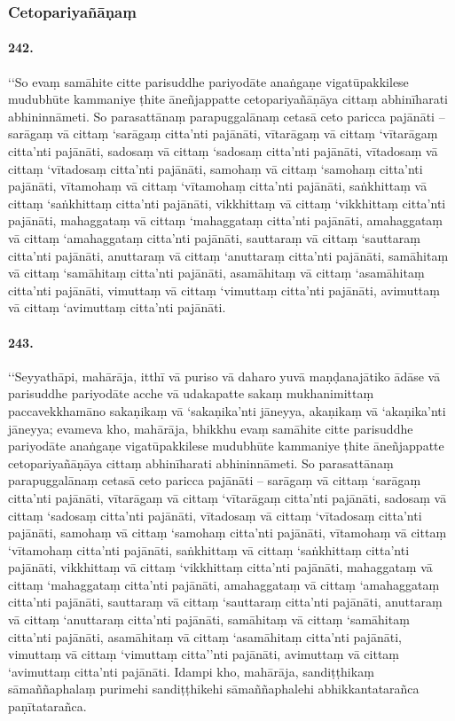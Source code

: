 \subsubsection{Cetopariyañāṇaṃ}

\paragraph{242.} ‘‘So evaṃ samāhite citte parisuddhe pariyodāte anaṅgaṇe vigatūpakkilese mudubhūte kammaniye ṭhite āneñjappatte cetopariyañāṇāya cittaṃ abhinīharati abhininnāmeti. So parasattānaṃ parapuggalānaṃ cetasā ceto paricca pajānāti – sarāgaṃ vā cittaṃ ‘sarāgaṃ citta’nti pajānāti, vītarāgaṃ vā cittaṃ ‘vītarāgaṃ citta’nti pajānāti, sadosaṃ vā cittaṃ ‘sadosaṃ citta’nti pajānāti, vītadosaṃ vā cittaṃ ‘vītadosaṃ citta’nti pajānāti, samohaṃ vā cittaṃ ‘samohaṃ citta’nti pajānāti, vītamohaṃ vā cittaṃ ‘vītamohaṃ citta’nti pajānāti, saṅkhittaṃ vā cittaṃ ‘saṅkhittaṃ citta’nti pajānāti, vikkhittaṃ vā cittaṃ ‘vikkhittaṃ citta’nti pajānāti, mahaggataṃ vā cittaṃ ‘mahaggataṃ citta’nti pajānāti, amahaggataṃ vā cittaṃ ‘amahaggataṃ citta’nti pajānāti, sauttaraṃ vā cittaṃ ‘sauttaraṃ citta’nti pajānāti, anuttaraṃ vā cittaṃ ‘anuttaraṃ citta’nti pajānāti, samāhitaṃ vā cittaṃ ‘samāhitaṃ citta’nti pajānāti, asamāhitaṃ vā cittaṃ ‘asamāhitaṃ citta’nti pajānāti, vimuttaṃ vā cittaṃ ‘vimuttaṃ citta’nti pajānāti, avimuttaṃ vā cittaṃ ‘avimuttaṃ citta’nti pajānāti.

\paragraph{243.} ‘‘Seyyathāpi, mahārāja, itthī vā puriso vā daharo yuvā maṇḍanajātiko ādāse vā parisuddhe pariyodāte acche vā udakapatte sakaṃ mukhanimittaṃ paccavekkhamāno sakaṇikaṃ vā ‘sakaṇika’nti jāneyya, akaṇikaṃ vā ‘akaṇika’nti jāneyya; evameva kho, mahārāja, bhikkhu evaṃ samāhite citte parisuddhe pariyodāte anaṅgaṇe vigatūpakkilese mudubhūte kammaniye ṭhite āneñjappatte cetopariyañāṇāya cittaṃ abhinīharati abhininnāmeti. So parasattānaṃ parapuggalānaṃ cetasā ceto paricca pajānāti – sarāgaṃ vā cittaṃ ‘sarāgaṃ citta’nti pajānāti, vītarāgaṃ vā cittaṃ ‘vītarāgaṃ citta’nti pajānāti, sadosaṃ vā cittaṃ ‘sadosaṃ citta’nti pajānāti, vītadosaṃ vā cittaṃ ‘vītadosaṃ citta’nti pajānāti, samohaṃ vā cittaṃ ‘samohaṃ citta’nti pajānāti, vītamohaṃ vā cittaṃ ‘vītamohaṃ citta’nti pajānāti, saṅkhittaṃ vā cittaṃ ‘saṅkhittaṃ citta’nti pajānāti, vikkhittaṃ vā cittaṃ ‘vikkhittaṃ citta’nti pajānāti, mahaggataṃ vā cittaṃ ‘mahaggataṃ citta’nti pajānāti, amahaggataṃ vā cittaṃ ‘amahaggataṃ citta’nti pajānāti, sauttaraṃ vā cittaṃ ‘sauttaraṃ citta’nti pajānāti, anuttaraṃ vā cittaṃ ‘anuttaraṃ citta’nti pajānāti, samāhitaṃ vā cittaṃ ‘samāhitaṃ citta’nti pajānāti, asamāhitaṃ vā cittaṃ ‘asamāhitaṃ citta’nti pajānāti, vimuttaṃ vā cittaṃ ‘vimuttaṃ citta’’nti pajānāti, avimuttaṃ vā cittaṃ ‘avimuttaṃ citta’nti pajānāti. Idampi kho, mahārāja, sandiṭṭhikaṃ sāmaññaphalaṃ purimehi sandiṭṭhikehi sāmaññaphalehi abhikkantatarañca paṇītatarañca.

